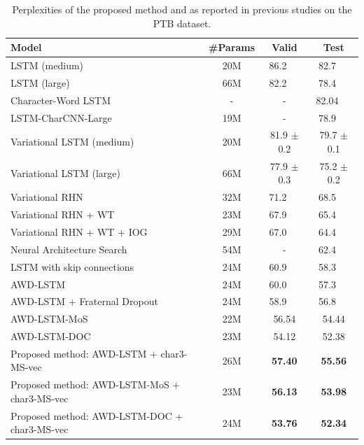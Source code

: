 \documentclass[letterpaper]{article} %
\begin{document}
\begin{table}[!t]
  \centering
  \begin{tabular}{ l  | c | c c }
  \toprule
  Model & \#Params & Valid & Test \\
  \midrule
  LSTM (medium) \cite{DBLP:journals/corr/ZarembaSV14} & 20M & 86.2 \ \  & 82.7 \ \  \\
  LSTM (large) \cite{DBLP:journals/corr/ZarembaSV14} & 66M & 82.2 \ \  & 78.4 \ \  \\
  Character-Word LSTM \cite{verwimp-EtAl:2017:EACLlong} & - & - & 82.04 \ \  \\
  LSTM-CharCNN-Large \cite{Kim:2016:CNL:3016100.3016285} & 19M & - & 78.9 \ \  \\
  Variational LSTM (medium) \cite{Gal2016Theoretically} & 20M & 81.9 $\pm$ 0.2 & 79.7 $\pm$ 0.1 \\
  Variational LSTM (large) \cite{Gal2016Theoretically} & 66M & 77.9 $\pm$ 0.3 & 75.2 $\pm$ 0.2 \\
  Variational RHN \cite{zilly2016recurrent} & 32M & 71.2 \ \  & 68.5 \ \  \\
  Variational RHN + WT \cite{zilly2016recurrent} & 23M & 67.9 \ \  & 65.4 \ \  \\
  Variational RHN + WT + IOG \cite{takase-suzuki-nagata:2017:I17-2} & 29M & 67.0 \ \  & 64.4 \ \  \\
  Neural Architecture Search \cite{45826} & 54M & - & 62.4 \ \  \\
  LSTM with skip connections \cite{DBLP:journals/corr/MelisDB17} & 24M & 60.9 \ \  & 58.3 \ \  \\
  AWD-LSTM \cite{merityRegOpt} & 24M & 60.0 \ \  & 57.3 \ \  \\
  AWD-LSTM + Fraternal Dropout \cite{fraternal} & 24M & 58.9 \ \  & 56.8 \ \  \\
  AWD-LSTM-MoS \cite{DBLP:journals/corr/abs-1711-03953} & 22M & 56.54 & 54.44 \\
  AWD-LSTM-DOC \cite{D18-1489} & 23M & 54.12 & 52.38 \\  
  \midrule
  Proposed method: AWD-LSTM + char3-MS-vec & 26M & {\bf 57.40} & {\bf 55.56} \\
  Proposed method: AWD-LSTM-MoS + char3-MS-vec & 23M & {\bf 56.13} & {\bf 53.98} \\
  Proposed method: AWD-LSTM-DOC + char3-MS-vec & 24M & {\bf 53.76} & {\bf 52.34} \\
  \bottomrule
  \end{tabular}
  \caption{Perplexities of the proposed method and as reported in previous studies on the PTB dataset.\label{tb:perplexity}}
\end{table}
\end{document}
